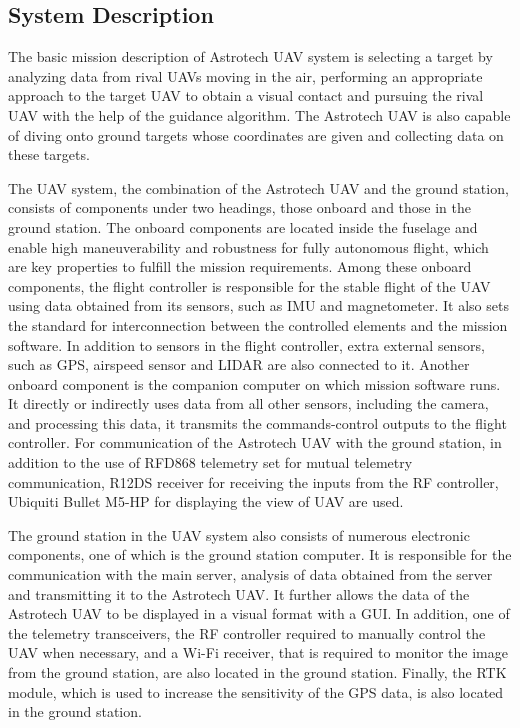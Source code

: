 \documentclass[12pt]{article}
\begin{document}
\subsection{System Description}
\justify 

The basic mission description of Astrotech UAV system is selecting a target by analyzing data from rival UAVs moving in the air, performing an appropriate approach to the target UAV to obtain a visual contact and pursuing the rival UAV with the help of the guidance algorithm. The Astrotech UAV is also capable of diving onto ground targets whose coordinates are given and collecting data on these targets.

\justify
The UAV system, the combination of the Astrotech UAV and the ground station, consists of components under two headings, those onboard and those in the ground station. The onboard components are located inside the fuselage and enable high maneuverability and robustness for fully autonomous flight, which are key properties to fulfill the mission requirements. Among these onboard components, the flight controller is responsible for the stable flight of the UAV using data obtained from its sensors, such as IMU and magnetometer. It also sets the standard for interconnection between the controlled elements and the mission software. In addition to sensors in the flight controller, extra external sensors, such as GPS, airspeed sensor and LIDAR are also connected to it. Another onboard component is the companion computer on which mission software runs. It directly or indirectly uses data from all other sensors, including the camera, and processing this data, it transmits the commands-control outputs to the flight controller. For communication of the Astrotech UAV with the ground station, in addition to the use of RFD868 telemetry set for mutual telemetry communication, R12DS receiver for receiving the inputs from the RF controller, Ubiquiti Bullet M5-HP for displaying the view of UAV are used.

\justify
The ground station in the UAV system also consists of numerous electronic components, one of which is the ground station computer. It is responsible for the communication with the main server, analysis of data obtained from the server and transmitting it to the Astrotech UAV. It further allows the data of the Astrotech UAV to be displayed in a visual format with a GUI. In addition, one of the telemetry transceivers, the RF controller required to manually control the UAV when necessary, and a Wi-Fi receiver, that is required to monitor the image from the ground station, are also located in the ground station. Finally, the RTK module, which is used to increase the sensitivity of the GPS data, is also located in the ground station.
\end{document}
